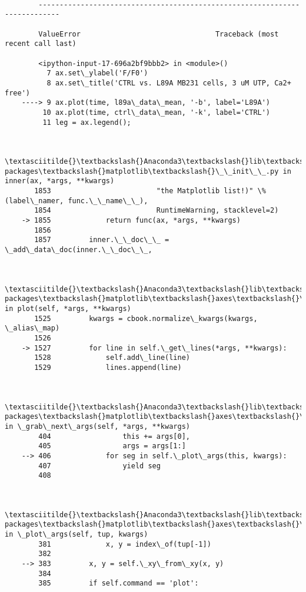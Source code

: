 \documentclass[11pt]{article}
\begin{document}
    \begin{Verbatim}[commandchars=\\\{\}]

        ---------------------------------------------------------------------------

        ValueError                                Traceback (most recent call last)

        <ipython-input-17-696a2bf9bbb2> in <module>()
          7 ax.set\_ylabel('F/F0')
          8 ax.set\_title('CTRL vs. L89A MB231 cells, 3 uM UTP, Ca2+ free')
    ----> 9 ax.plot(time, l89a\_data\_mean, '-b', label='L89A')
         10 ax.plot(time, ctrl\_data\_mean, '-k', label='CTRL')
         11 leg = ax.legend();
    

        \textasciitilde{}\textbackslash{}Anaconda3\textbackslash{}lib\textbackslash{}site-packages\textbackslash{}matplotlib\textbackslash{}\_\_init\_\_.py in inner(ax, *args, **kwargs)
       1853                         "the Matplotlib list!)" \% (label\_namer, func.\_\_name\_\_),
       1854                         RuntimeWarning, stacklevel=2)
    -> 1855             return func(ax, *args, **kwargs)
       1856 
       1857         inner.\_\_doc\_\_ = \_add\_data\_doc(inner.\_\_doc\_\_,
    

        \textasciitilde{}\textbackslash{}Anaconda3\textbackslash{}lib\textbackslash{}site-packages\textbackslash{}matplotlib\textbackslash{}axes\textbackslash{}\_axes.py in plot(self, *args, **kwargs)
       1525         kwargs = cbook.normalize\_kwargs(kwargs, \_alias\_map)
       1526 
    -> 1527         for line in self.\_get\_lines(*args, **kwargs):
       1528             self.add\_line(line)
       1529             lines.append(line)
    

        \textasciitilde{}\textbackslash{}Anaconda3\textbackslash{}lib\textbackslash{}site-packages\textbackslash{}matplotlib\textbackslash{}axes\textbackslash{}\_base.py in \_grab\_next\_args(self, *args, **kwargs)
        404                 this += args[0],
        405                 args = args[1:]
    --> 406             for seg in self.\_plot\_args(this, kwargs):
        407                 yield seg
        408 
    

        \textasciitilde{}\textbackslash{}Anaconda3\textbackslash{}lib\textbackslash{}site-packages\textbackslash{}matplotlib\textbackslash{}axes\textbackslash{}\_base.py in \_plot\_args(self, tup, kwargs)
        381             x, y = index\_of(tup[-1])
        382 
    --> 383         x, y = self.\_xy\_from\_xy(x, y)
        384 
        385         if self.command == 'plot':
    


\end{Verbatim}
\end{document}
